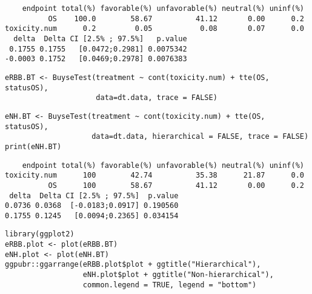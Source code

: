 \documentclass[12pt]{article}
\begin{document}
\begin{verbatim}
    endpoint total(%) favorable(%) unfavorable(%) neutral(%) uninf(%)
          OS    100.0        58.67          41.12       0.00      0.2
toxicity.num      0.2         0.05           0.08       0.07      0.0
  delta  Delta CI [2.5% ; 97.5%]   p.value
 0.1755 0.1755   [0.0472;0.2981] 0.0075342
-0.0003 0.1752   [0.0469;0.2978] 0.0076383
\end{verbatim}


\lstset{language=r,label= ,caption= ,captionpos=b,numbers=none}
\begin{lstlisting}
eRBB.BT <- BuyseTest(treatment ~ cont(toxicity.num) + tte(OS, statusOS),
                     data=dt.data, trace = FALSE)
\end{lstlisting}

\lstset{language=r,label= ,caption= ,captionpos=b,numbers=none}
\begin{lstlisting}
eNH.BT <- BuyseTest(treatment ~ cont(toxicity.num) + tte(OS, statusOS),
                    data=dt.data, hierarchical = FALSE, trace = FALSE)
print(eNH.BT)
\end{lstlisting}

\begin{verbatim}
    endpoint total(%) favorable(%) unfavorable(%) neutral(%) uninf(%)
toxicity.num      100        42.74          35.38      21.87      0.0
          OS      100        58.67          41.12       0.00      0.2
 delta  Delta CI [2.5% ; 97.5%]  p.value
0.0736 0.0368  [-0.0183;0.0917] 0.190560
0.1755 0.1245   [0.0094;0.2365] 0.034154
\end{verbatim}


\lstset{language=r,label= ,caption= ,captionpos=b,numbers=none}
\begin{lstlisting}
library(ggplot2)
eRBB.plot <- plot(eRBB.BT)
eNH.plot <- plot(eNH.BT)
ggpubr::ggarrange(eRBB.plot$plot + ggtitle("Hierarchical"),
                  eNH.plot$plot + ggtitle("Non-hierarchical"),
                  common.legend = TRUE, legend = "bottom")
\end{lstlisting}
\end{document}
